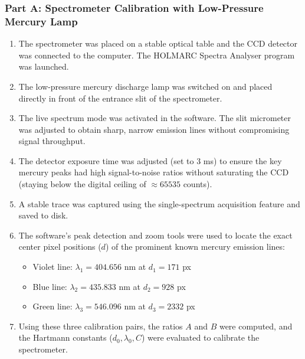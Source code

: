 \documentclass[12pt, a4paper]{article}
\begin{document}
\subsubsection{Part A: Spectrometer Calibration with Low-Pressure Mercury Lamp}
\begin{enumerate}
    \item The spectrometer was placed on a stable optical table and the CCD detector was connected to the computer. The HOLMARC Spectra Analyser program was launched.
    \item The low-pressure mercury discharge lamp was switched on and placed directly in front of the entrance slit of the spectrometer.
    \item The live spectrum mode was activated in the software. The slit micrometer was adjusted to obtain sharp, narrow emission lines without compromising signal throughput.
    \item The detector exposure time was adjusted (set to 3 ms) to ensure the key mercury peaks had high signal-to-noise ratios without saturating the CCD (staying below the digital ceiling of $\approx 65535$ counts).
    \item A stable trace was captured using the single-spectrum acquisition feature and saved to disk.
    \item The software's peak detection and zoom tools were used to locate the exact center pixel positions ($d$) of the prominent known mercury emission lines:
    \begin{itemize}
        \item Violet line: $\lambda_1 = 404.656$ nm at $d_1 = 171$ px
        \item Blue line: $\lambda_2 = 435.833$ nm at $d_2 = 928$ px
        \item Green line: $\lambda_3 = 546.096$ nm at $d_3 = 2332$ px
    \end{itemize}
    \item Using these three calibration pairs, the ratios $A$ and $B$ were computed, and the Hartmann constants ($d_0, \lambda_0, C$) were evaluated to calibrate the spectrometer.
\end{enumerate}
\end{document}
